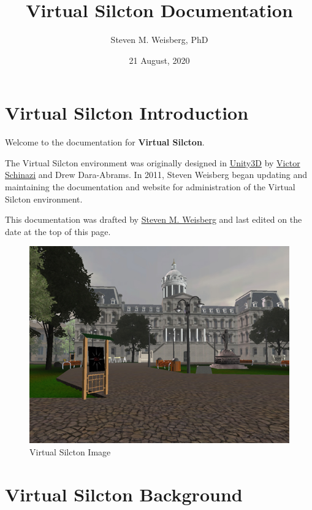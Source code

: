 \documentclass[
  12pt,
]{book}
\title{Virtual Silcton Documentation}
\author{Steven M. Weisberg, PhD}
\date{21 August, 2020}
\begin{document}
\maketitle

{
\hypersetup{linkcolor=}
\setcounter{tocdepth}{1}
\tableofcontents
}
\hypertarget{virtual-silcton-introduction}{%
\chapter{Virtual Silcton Introduction}\label{virtual-silcton-introduction}}

Welcome to the documentation for \textbf{Virtual Silcton}.

The Virtual Silcton environment was originally designed in \href{https://unity.com/}{Unity3D} by \href{vschinaz@bond.edu.au}{Victor Schinazi} and Drew Dara-Abrams. In 2011, Steven Weisberg began updating and maintaining the documentation and website for administration of the Virtual Silcton environment.

This documentation was drafted by \href{scannlab.psych.ufl.edu}{Steven M. Weisberg} and last edited on the date at the top of this page.

\begin{figure}
\centering
\includegraphics{./figs/Cover_Page.jpg}
\caption{Virtual Silcton Image}
\end{figure}

\hypertarget{virtual-silcton-background}{%
\chapter{Virtual Silcton Background}\label{virtual-silcton-background}}
\end{document}
